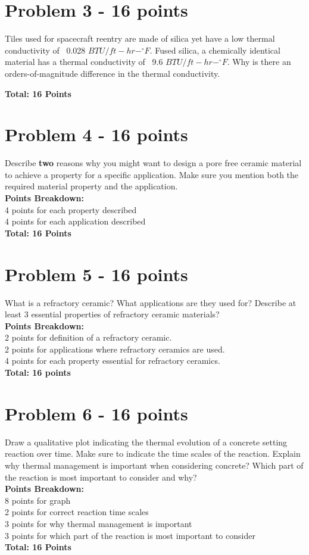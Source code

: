 \documentclass[12pt,letterpaper]{article}
\begin{document}
\section*{Problem 3 - 16 points}
Tiles used for spacecraft reentry are made of silica yet have a low thermal conductivity of ~0.028 $BTU/ft-hr-^{\circ}F$. Fused silica, a chemically identical material has a thermal conductivity of ~9.6 $BTU/ft-hr-^{\circ}F$. Why is there an orders-of-magnitude difference in the thermal conductivity. 

\textbf{Total: 16  Points}

\section*{Problem 4 - 16 points}

Describe \textbf{two} reasons why you might want to design a pore free ceramic material to achieve a property for a specific application. Make sure you mention both the required material property and the application. \\

\textbf{Points Breakdown:}\\[12pt]
4 points for each property described\\
4 points for each application described\\[6 pt]
\textbf{Total: 16 Points}

\section*{Problem 5 - 16 points}

What is a refractory ceramic? What applications are they used for? Describe at least 3 essential properties of refractory ceramic materials?\\

\textbf{Points Breakdown:}\\[12pt]
2 points for definition of a refractory ceramic.\\
2 points for applications where refractory ceramics are used. \\
4 points for each property essential for refractory ceramics. \\[6 pt]
\textbf{Total: 16 points}


\section*{Problem 6 - 16 points}

Draw a qualitative plot indicating the thermal evolution of a concrete setting reaction over time. Make sure to indicate the time scales of the reaction. Explain why thermal management is important when considering concrete? Which part of the reaction is most important to consider and why?\\

\textbf{Points Breakdown:}\\[12pt]
8 points for graph\\
2 points for correct reaction time scales\\
3 points for why thermal management is important\\
3 points for which part of the reaction is most important to consider\\[6 pt]
\textbf{Total: 16 Points}
\end{document}
